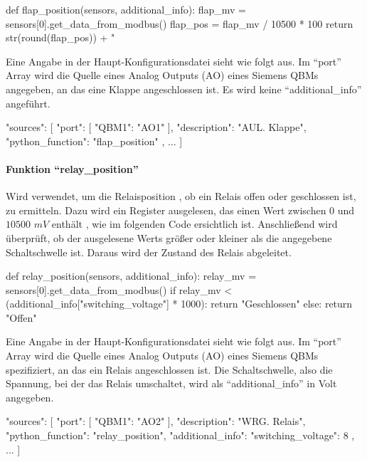 \begin{pythoncode}
def flap_position(sensors, additional_info):
	flap_mv = sensors[0].get_data_from_modbus()
	flap_pos = flap_mv / 10500 * 100
	return str(round(flap_pos)) + " %
\end{pythoncode}

Eine Angabe in der Haupt-Konfigurationsdatei sieht wie folgt aus. Im \enquote{port} Array wird die Quelle eines Analog Outputs (AO) eines Siemens QBMs angegeben, an das eine Klappe angeschlossen ist. Es wird keine \enquote{additional\_info} angeführt.

\begin{jsoncode}
"sources": [
	{
		"port": [
			{"QBM1": "AO1"}
		],
		"description": "AUL. Klappe",
		"python_function": "flap_position"
	},
	...
]
\end{jsoncode}



\paragraph{Funktion \enquote{relay\_position}}
Wird verwendet, um die Relaisposition \bzw, ob ein Relais offen oder geschlossen ist, zu ermitteln. Dazu wird ein Register ausgelesen, das einen Wert zwischen $0$ und $10500$ $mV$ enthält \cite[vgl.][17]{siemens:2021}, wie im folgenden Code ersichtlich ist. Anschließend wird überprüft, ob der ausgelesene Werts größer oder kleiner als die angegebene Schaltschwelle ist. Daraus wird der Zustand des Relais abgeleitet.

\begin{pythoncode}
def relay_position(sensors, additional_info):
	relay_mv = sensors[0].get_data_from_modbus()
	if relay_mv < (additional_info["switching_voltage"] * 1000):
		return "Geschlossen"
	else:
		return "Offen"

\end{pythoncode}

Eine Angabe in der Haupt-Konfigurationsdatei sieht wie folgt aus. Im \enquote{port} Array wird die Quelle eines Analog Outputs (AO) eines Siemens QBMs spezifiziert, an das ein Relais angeschlossen ist. Die Schaltschwelle, also die Spannung, bei der das Relais umschaltet, wird als \enquote{additional\_info} in Volt angegeben.

\begin{jsoncode}
"sources": [
	{
		"port": [
			{"QBM1": "AO2"}
		],
		"description": "WRG. Relais",
		"python_function": "relay_position",
		"additional_info": {"switching_voltage": 8}
	},
	...
]
\end{jsoncode}